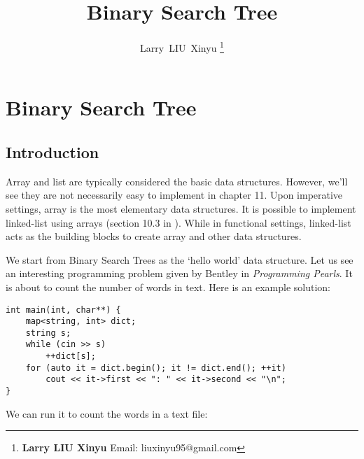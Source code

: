 \documentclass[b5paper]{article}
\begin{document}
\title{Binary Search Tree}

\author{Larry~LIU~Xinyu
\thanks{{\bfseries Larry LIU Xinyu } \newline
  Email: liuxinyu95@gmail.com \newline}
  }

\maketitle
\fi


\ifx\wholebook\relax
\chapter{Binary Search Tree}
\fi

\section{Introduction}
\label{introduction} 

Array and list are typically considered the basic data structures. However, we'll see they are not necessarily easy to implement in chapter 11. Upon imperative settings, array is the most elementary data structures. It is possible to implement linked-list using arrays (section  10.3 in \cite{CLRS}). While in functional settings, linked-list acts as the building blocks to create array and other data structures.

We start from Binary Search Trees as the `hello world' data structure. Let us see an interesting programming problem given by Bentley in {\em Programming Pearls}\cite{Bentley}. It is about to count the number of words in text. Here is an example solution:

\lstset{language=C++, frame=single}
\begin{lstlisting}
int main(int, char**) {
    map<string, int> dict;
    string s;
    while (cin >> s)
        ++dict[s];
    for (auto it = dict.begin(); it != dict.end(); ++it)
        cout << it->first << ": " << it->second << "\n";
}
\end{lstlisting}

We can run it to count the words in a text file:
\end{document}
